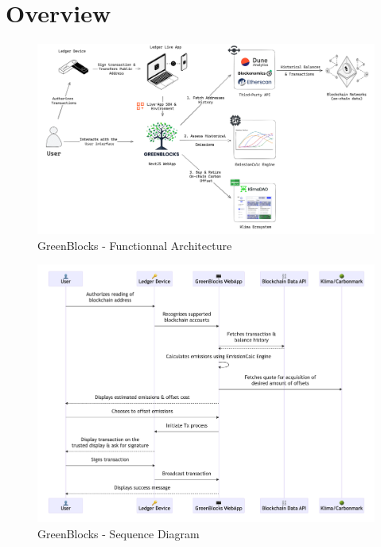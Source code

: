 \documentclass[11pt]{report}
\begin{document}
\section{Overview \label{se:implementation_overview}}
\begin{figure}[h!]
    \centering
    \centerline{\includegraphics[scale=0.08]{figures/functionnal architecture.png}}
    \caption{GreenBlocks - Functionnal Architecture}
    \label{fig:functionnal_architecture}
\end{figure}

\begin{figure}[hbt!]
    \centering
    \centerline{\includegraphics[scale=.27]{figures/sequence.png}}
    \caption{GreenBlocks - Sequence Diagram}
    \label{fig:sequence}
\end{figure}

\end{document}
